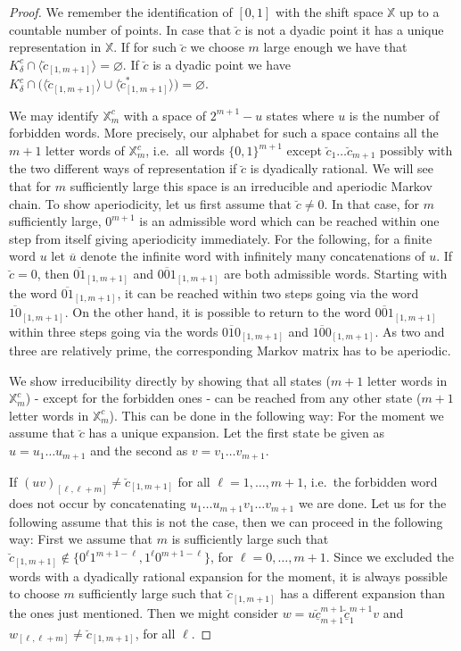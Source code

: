 \documentclass[11pt,reqno]{amsart}
\theoremstyle{plain}
\theoremstyle{definition}
\renewcommand{\emptyset}{\varnothing}
\begin{document}
\begin{proof}
 We remember the identification of $[0,1]$ with the shift space $\mathbb{X}$ up to a countable number of points. In case that $\breve{c}$ is not a dyadic point it has a unique representation in $\mathbb{X}$.
 If for such $\breve{c}$ we choose $m$ large enough we have that $K_{\delta}^{c}\cap \langle\breve{c}_{[1,m+1]}\rangle=\emptyset$. If $\breve{c}$ is a dyadic point we have 
 $K_{\delta}^c\cap \Big(\langle\breve{c}_{[1,m+1]}\rangle \cup \langle\breve{c}_{[1,m+1]}^{\ast}\rangle\Big)=\emptyset$.

We may identify $\mathbb{X}_m^{c}$ with a space of $2^{m+1}-u$ states where $u$ is the number of forbidden words.
More precisely, our alphabet for such a space contains all the $m+1$ letter words of $\mathbb{X}_m^{c}$, i.e.\ all words $\{0,1\}^{m+1}$ except $\breve{c}_1\ldots \breve{c}_{m+1}$ possibly with the two different ways of representation if $\breve{c}$ is dyadically rational. 
We will see that for $m$ sufficiently large this space is an irreducible and aperiodic Markov chain. 
To show aperiodicity, let us first assume that $\breve{c}\neq 0$. In that case, for $m$ sufficiently large, $0^{m+1}$ is an admissible word which can be reached within one step from itself giving aperiodicity immediately. 
For the following, for a finite word $u$ let $\overline{u}$ denote the infinite word with infinitely many concatenations of $u$. 
If $\breve{c}=0$, then $\overline{01}_{[1,m+1]}$ and $\overline{001}_{[1,m+1]}$ are both admissible words. 
Starting with the word $\overline{01}_{[1,m+1]}$, it can be reached within two steps going via the word $\overline{10}_{[1,m+1]}$. On the other hand, it is possible to return to the word $\overline{001}_{[1,m+1]}$ within three steps going via the words $\overline{010}_{[1,m+1]}$ and $\overline{100}_{[1,m+1]}$. As two and three are relatively prime, the corresponding Markov matrix has to be aperiodic.

We show irreducibility directly by showing that all states ($m+1$ letter words in $\mathbb{X}_m^{c}$) - except for the forbidden ones - can be reached from any other state ($m+1$ letter words in $\mathbb{X}_m^{c}$). This can be done in the following way:
For the moment we assume that $\breve{c}$ has a unique expansion.
Let the first state be given as $u=u_1\ldots u_{m+1}$ and the second as $v=v_1\ldots v_{m+1}$. 

If $(uv)_{[\ell, \ell+m]}\neq \breve{c}_{[1,m+1]}$ for all $\ell=1,\ldots, m+1$, i.e.\ the forbidden  word does not occur by concatenating $u_1\ldots u_{m+1}v_1\ldots v_{m+1}$ we are done. Let us for the following assume that this is not the case, then we can proceed in the following way: First we assume that $m$ is sufficiently large such that $\breve{c}_{[1,m+1]}\notin\{ 0^{\ell}1^{m+1-\ell}, 1^{\ell}0^{m+1-\ell}\}$, for $\ell=0,\ldots, m+1$.
Since we excluded the words with a dyadically rational expansion for the moment, it is always possible to choose $m$ sufficiently large such that $\breve{c}_{[1,m+1]}$ has a different expansion than the ones just mentioned. Then we might consider $w= u  \breve{\underline{c}}_{m+1}^{m+1} \breve{\underline{c}}_1^{m+1} v$ 
and $w_{[\ell,\ell+m]}\neq \breve{c}_{[1,m+1]}$, for all $\ell$.
 


\end{proof}
\end{document}

